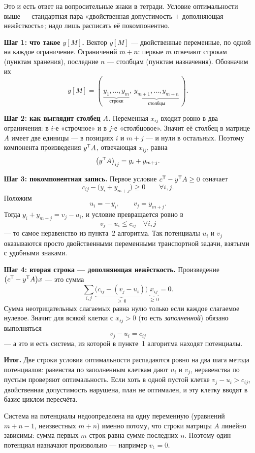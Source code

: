 \begin{idea}[title={Откуда берутся $v_j - u_i \le c_{ij}$ и $v_j - u_i = c_{ij}$}]
Это и есть ответ на вопросительные знаки в тетради. Условие оптимальности выше —
стандартная пара «двойственная допустимость $+$ дополняющая нежёсткость»; надо
лишь расписать её покомпонентно.

\medskip
\textbf{Шаг 1: что такое $y[M]$.} Вектор $y[M]$ — двойственные переменные, по одной
на каждое ограничение. Ограничений $m + n$: первые $m$ отвечают строкам (пунктам
хранения), последние $n$ — столбцам (пунктам назначения). Обозначим их
\[
  y[M] = (\,\underbrace{y_1, \dots, y_m}_{\text{строки}},\
            \underbrace{y_{m+1}, \dots, y_{m+n}}_{\text{столбцы}}\,) .
\]

\medskip
\textbf{Шаг 2: как выглядит столбец $A$.} Переменная $x_{ij}$ входит ровно в два
ограничения: в $i$-е «строчное» и в $j$-е «столбцовое». Значит её столбец в
матрице $A$ имеет две единицы — в позициях $i$ и $m+j$ — и нули в остальных.
Поэтому компонента произведения $y^{\mathsf{T}} A$, отвечающая $x_{ij}$, равна
\[
  \big(y^{\mathsf{T}} A\big)_{ij} = y_i + y_{m+j} .
\]

\medskip
\textbf{Шаг 3: покомпонентная запись.} Первое условие
$c^{\mathsf{T}} - y^{\mathsf{T}} A \ge 0$ означает
\[
  c_{ij} - \big(y_i + y_{m+j}\big) \ge 0 \qquad \forall i, j .
\]
Положим
\[
  u_i = -\,y_i , \qquad v_j = y_{m+j} .
\]
Тогда $y_i + y_{m+j} = v_j - u_i$, и условие превращается ровно в
\[
  \boxed{\,v_j - u_i \le c_{ij} \quad \forall i, j\,}
\]
— то самое неравенство из пункта~2 алгоритма. Так потенциалы $u_i$ и $v_j$
оказываются просто двойственными переменными транспортной задачи, взятыми с
удобными знаками.

\medskip
\textbf{Шаг 4: вторая строка — дополняющая нежёсткость.} Произведение
$\big(c^{\mathsf{T}} - y^{\mathsf{T}} A\big) x$ — это сумма
\[
  \sum_{i,j} \underbrace{\big(c_{ij} - (v_j - u_i)\big)}_{\ge\, 0}\,
             \underbrace{x_{ij}}_{\ge\, 0} = 0 .
\]
Сумма неотрицательных слагаемых равна нулю только если каждое слагаемое нулевое.
Значит для всякой клетки с $x_{ij} > 0$ (то есть \emph{заполненной}) обязано
выполняться
\[
  \boxed{\,v_j - u_i = c_{ij}\,}
\]
— а это и есть система, из которой в пункте~1 алгоритма находят потенциалы.

\medskip
\textbf{Итог.} Две строки условия оптимальности распадаются ровно на два шага
метода потенциалов: равенства по заполненным клеткам дают $u_i$ и $v_j$,
неравенства по пустым проверяют оптимальность. Если хоть в одной пустой клетке
$v_j - u_i > c_{ij}$, двойственная допустимость нарушена, план не оптимален, и
эту клетку вводят в базис циклом пересчёта.

Система на потенциалы недоопределена на одну переменную (уравнений $m+n-1$,
неизвестных $m+n$) именно потому, что строки матрицы $A$ линейно зависимы:
сумма первых $m$ строк равна сумме последних $n$. Поэтому один потенциал
назначают произвольно — например $v_1 = 0$.
\end{idea}

